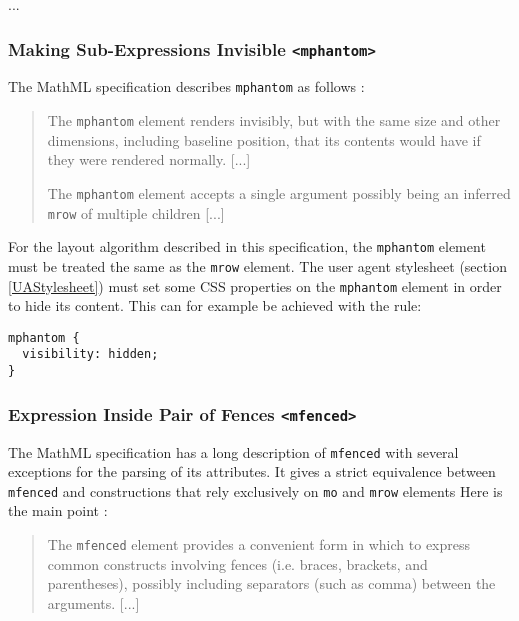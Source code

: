 \begin{figure}
\centering
\begin{tikzpicture}[yscale=-1]
\end{tikzpicture}
\label{MpaddedBoxModel}
\end{figure}

...

\subsubsection{Making Sub-Expressions Invisible {\tt <mphantom>}}

The MathML specification describes {\tt mphantom} as follows \cite{MathML3}:
%
\begin{quote}
The {\tt mphantom} element renders invisibly, but with the same size and other
dimensions, including baseline position, that its contents would have if they
were rendered normally. [...]

The {\tt mphantom} element accepts a single argument possibly being an inferred
{\tt mrow} of multiple children [...]
\end{quote}

For the layout algorithm described in this specification, the
{\tt mphantom} element must be treated the same as the {\tt mrow} element.
The user agent stylesheet (section \ref{UAStylesheet})
must set some CSS properties on the {\tt mphantom}
element in order to hide its content. This can for example be achieved with
the rule:
%
\begin{lstlisting}
mphantom {
  visibility: hidden;
}
\end{lstlisting}

\subsubsection{Expression Inside Pair of Fences {\tt <mfenced>}}

The MathML specification has a long description of {\tt mfenced} with several
exceptions for the parsing of its attributes. It gives a strict equivalence
between {\tt mfenced} and constructions that rely exclusively on {\tt mo} and
{\tt mrow} elements Here is the main point \cite{MathML3}:
%
\begin{quote}
The {\tt mfenced} element provides a convenient form in which to express common
constructs involving fences (i.e. braces, brackets, and parentheses),
possibly including separators (such as comma) between the arguments.
[...]
\end{quote}

